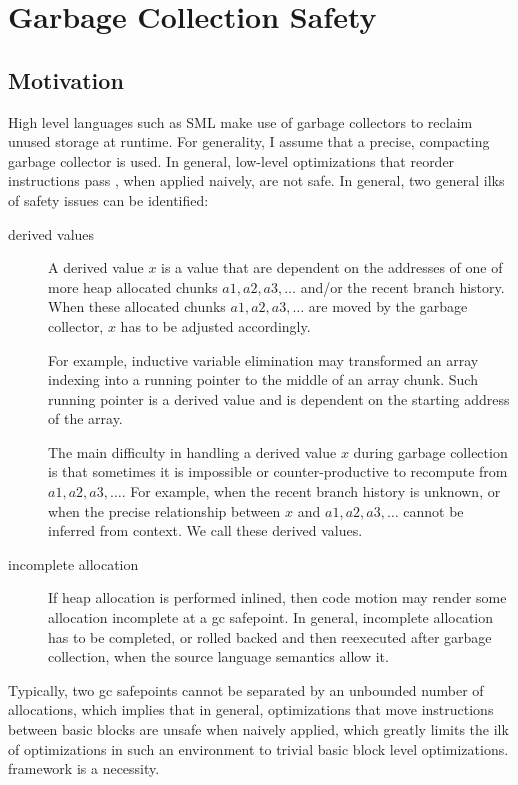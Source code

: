 \section{Garbage Collection Safety}
\subsection{Motivation}
   High level languages such as SML make use of garbage collectors
to reclaim unused storage at runtime.   For generality, I assume that
a precise, compacting garbage collector is used.  In general, 
low-level optimizations that reorder instructions 
pass , when applied naively, 
are not safe.  In general, two general ilks of safety issues can be identified:
\begin{description}
 \item[derived values] 
A derived value $x$ is a value that are
dependent on the addresses of one of more heap allocated chunks
$a1,a2,a3,\ldots$ and/or the recent branch history.
When these allocated chunks $a1,a2,a3,\ldots$
are moved by the garbage collector, $x$
has to be adjusted accordingly.  

For example, inductive variable elimination may transformed an array
indexing into a running pointer to the middle of an array chunk.
Such running pointer is a derived value and is dependent on the 
starting address of the array. 

The main difficulty in handling a derived value $x$ 
during garbage collection is that sometimes it is impossible or 
counter-productive to recompute from $a1,a2,a3,\ldots$.
For example, when the recent branch history is unknown, or when the
precise relationship between $x$ and $a1,a2,a3,\ldots$ cannot
be inferred from context.  
We call these  derived values.  
  \item[incomplete allocation]
   If heap allocation is performed inlined, then code motion may 
render some allocation incomplete at a gc safepoint.  In general, incomplete
allocation has to be completed, or rolled backed and then reexecuted
after garbage collection, when the source language semantics allow it.
\end{description}

Typically, two gc safepoints cannot be separated by an unbounded
number of allocations, which implies that in general, optimizations that move
instructions between basic blocks are unsafe when naively applied,
which greatly limits the ilk of optimizations in such an environment
to trivial basic block level optimizations. 
framework is a necessity.


